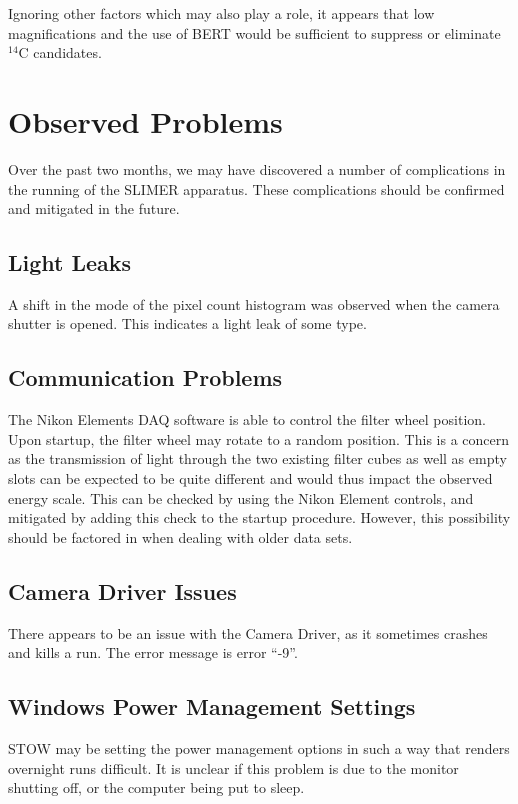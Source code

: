 \documentclass[11pt]{article}
\newcommand{\nuc}[2]{\ensuremath{^{#1}}#2}
\begin{document}
Ignoring other factors which may also play a role, it appears that low magnifications and the use of BERT would be sufficient to suppress or eliminate \nuc{14}{C} candidates.    


      
 
  
\section{Observed Problems}
Over the past two months, we may have discovered a number of complications in the running of the SLIMER apparatus. These complications should be confirmed and mitigated in the future.

\subsection{Light Leaks}
A shift in the mode of the pixel count histogram was observed when the camera shutter is opened. This indicates a light leak of some type. 

\subsection{Communication Problems}
The Nikon Elements DAQ software is able to control the filter wheel position. Upon startup, the filter wheel may rotate to a random position. This is a concern as the transmission of 
light through the two existing filter cubes as well as empty slots can be expected to be quite different and would thus impact the observed energy scale.
This can be checked by using the Nikon Element controls, and mitigated by adding this check to the startup procedure. However, this possibility should be factored in
when dealing with older data sets. 


\subsection{Camera Driver Issues}
There appears to be an issue with the Camera Driver, as it sometimes crashes and kills a run. The error message is error ``-9''.

\subsection{Windows Power Management Settings}
STOW may be setting the power management options in such a way that renders overnight runs difficult. It is unclear if this problem is due to the monitor shutting off, or the computer being put to sleep.
\end{document}
